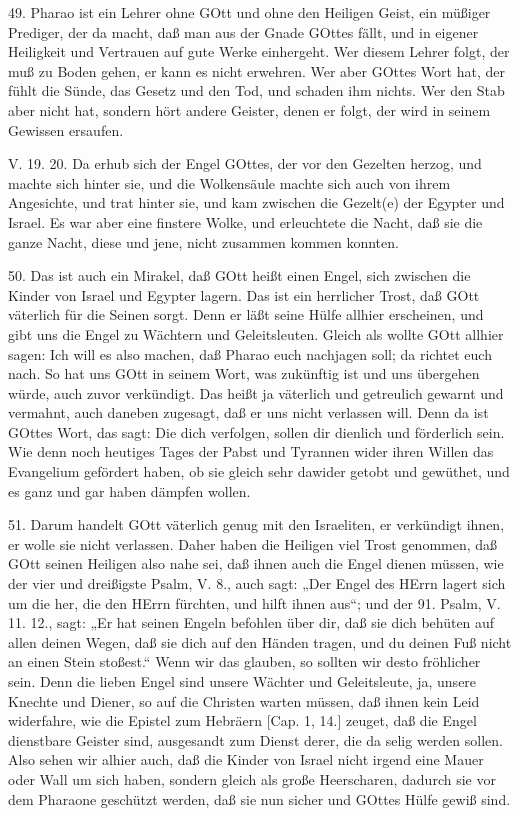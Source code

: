 49. Pharao ist ein Lehrer ohne GOtt und ohne den Heiligen Geist, ein müßiger Prediger, der da macht, daß man aus der Gnade GOttes fällt, und in eigener Heiligkeit und Vertrauen auf gute Werke einhergeht. Wer diesem Lehrer folgt, der muß zu Boden gehen, er kann es nicht erwehren. Wer aber GOttes Wort hat, der fühlt die Sünde, das Gesetz und den Tod, und schaden ihm nichts. Wer den Stab aber nicht hat, sondern hört andere Geister, denen er folgt, der wird in seinem Gewissen ersaufen.

\begin{schriftzitat}
V. 19. 20. Da erhub sich der Engel GOttes, der vor den Gezelten herzog, und machte sich hinter sie, und die Wolkensäule machte sich auch von ihrem Angesichte, und trat hinter sie, und kam zwischen die Gezelt(e) der Egypter und Israel. Es war aber eine finstere Wolke, und erleuchtete die Nacht, daß sie die ganze Nacht, diese und jene, nicht zusammen kommen konnten.
\end{schriftzitat}

50. Das ist auch ein Mirakel, daß GOtt heißt einen Engel, sich zwischen die Kinder von Israel und Egypter lagern. Das ist ein herrlicher Trost, daß GOtt väterlich für die Seinen sorgt. Denn er läßt seine Hülfe allhier erscheinen, und gibt uns die Engel zu Wächtern und Geleitsleuten. Gleich als wollte GOtt allhier sagen: Ich will es also machen, daß Pharao euch nachjagen soll; da richtet euch nach. So hat uns GOtt in seinem Wort, was zukünftig ist und uns übergehen würde, auch zuvor verkündigt. Das heißt ja väterlich und getreulich gewarnt und vermahnt, auch daneben zugesagt, daß er uns nicht verlassen will. Denn da ist GOttes Wort, das sagt: Die dich verfolgen, sollen dir dienlich und förderlich sein. Wie denn noch heutiges Tages der Pabst und Tyrannen wider ihren Willen das Evangelium gefördert haben, ob sie gleich sehr dawider getobt und gewüthet, und es ganz und gar haben dämpfen wollen.

51. Darum handelt GOtt väterlich genug mit den Israeliten, er verkündigt ihnen, er wolle sie nicht verlassen. Daher haben die Heiligen viel Trost genommen, daß GOtt seinen Heiligen also nahe sei, daß ihnen auch die Engel
dienen müssen, wie der vier und dreißigste Psalm, V. 8., auch sagt: „Der Engel des HErrn lagert sich um die her, die den HErrn fürchten, und hilft ihnen aus“; und der 91. Psalm, V. 11. 12., sagt: „Er hat seinen Engeln befohlen über dir, daß sie dich behüten auf allen deinen Wegen, daß sie dich auf den Händen tragen, und du deinen Fuß nicht an einen Stein stoßest.“ Wenn wir das glauben, so sollten wir desto fröhlicher sein. Denn die lieben Engel sind unsere Wächter und Geleitsleute, ja, unsere Knechte und Diener, so auf die Christen warten müssen, daß ihnen kein Leid widerfahre, wie die Epistel zum Hebräern [Cap. 1, 14.] zeuget, daß die Engel dienstbare Geister sind, ausgesandt zum Dienst derer, die da selig werden sollen. Also sehen wir alhier auch, daß die Kinder von Israel nicht irgend eine Mauer oder Wall um sich haben, sondern gleich als große Heerscharen, dadurch sie vor dem Pharaone geschützt werden, daß sie nun sicher und GOttes Hülfe gewiß sind.

